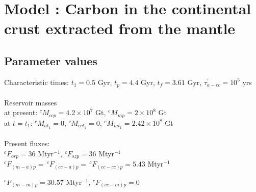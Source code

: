 \documentclass[14pt]{article}
\date{}
\begin{document}
\section*{Model : Carbon in the continental crust extracted from the mantle}
\thispagestyle{empty}

\subsection*{Parameter values}

Characteristic times: 
 $t_1 = 0.5$ Gyr, $t_p = 4.4$ Gyr, $t_f = 3.61$ Gyr, $\tau^{'}_{a-cc} = 10^5$ yrs
 \\ \\
\noindent Reservoir masses \\
at present: $^cM_{ccp} = 4.2 \times 10^7$ Gt, $^cM_{mp} = 2 \times 10^8$ Gt \\
at $t = t_1$: $^cM_{at_{1}} = 0$, $^cM_{cct_{1}} = 0$, $^cM_{mt_{1}} = 2.42 \times 10^8$ Gt
\\ \\
\noindent Present fluxes: \\
$^cF_{orp} = 36$ Mtyr$^{-1}$, $^cF_{szp} = 36$ Mtyr$^{-1}$ \\
$^cF_{(m-a)p} = \,^cF_{(cc-a)p} = \,^cF_{(cc-cc)p} = 5.43$ Mtyr$^{-1}$

\noindent $^cF_{(m-m)p} = 30.57$ Mtyr$^{-1}$, $^cF_{(cc-m)p} = 0$
\end{document}
